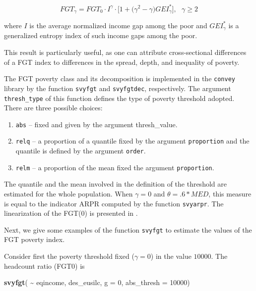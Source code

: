 \documentclass[
]{book}
\newenvironment{Shaded}{\begin{snugshade}}{\end{snugshade}}
\newcommand{\AttributeTok}[1]{\textcolor[rgb]{0.13,0.29,0.53}{#1}}
\newcommand{\DecValTok}[1]{\textcolor[rgb]{0.00,0.00,0.81}{#1}}
\newcommand{\FunctionTok}[1]{\textcolor[rgb]{0.13,0.29,0.53}{\textbf{#1}}}
\newcommand{\NormalTok}[1]{#1}
\newcommand{\SpecialCharTok}[1]{\textcolor[rgb]{0.81,0.36,0.00}{\textbf{#1}}}
\providecommand{\tightlist}{%
  \setlength{\itemsep}{0pt}\setlength{\parskip}{0pt}}
\begin{document}
\[
FGT_\gamma = FGT_0 \cdot I^\gamma \cdot \big[ 1 + \big( \gamma^2 -\gamma \big) GEI_\gamma^* \big] , \text{ } \gamma \geq 2
\]

where \(I\) is the average normalized income gap among the poor and \(GEI_\gamma^*\) is a generalized entropy index of such income gaps among the poor.

This result is particularly useful, as one can attribute cross-sectional differences of a FGT index to differences in the spread, depth, and inequality of poverty.

The FGT poverty class and its decomposition is implemented in the \texttt{convey} library by the function \texttt{svyfgt} and \texttt{svyfgtdec}, respectively.
The argument \texttt{thresh\_type} of this function defines the type of poverty threshold adopted.
There are three possible choices:

\begin{enumerate}
\def\labelenumi{\arabic{enumi}.}
\tightlist
\item
  \texttt{abs} -- fixed and given by the argument thresh\_value.
\item
  \texttt{relq} -- a proportion of a quantile fixed by the argument \texttt{proportion} and the quantile is defined by the argument \texttt{order}.
\item
  \texttt{relm} -- a proportion of the mean fixed the argument \texttt{proportion}.
\end{enumerate}

The quantile and the mean involved in the definition of the threshold are estimated for the whole population. When \(\gamma=0\) and \(\theta= .6*MED\), this measure is equal to the indicator ARPR computed by the function \texttt{svyarpr}. The linearization of the FGT(0) is presented in \textcite{berger2003}.

Next, we give some examples of the function \texttt{svyfgt} to estimate the values of the FGT poverty index.

Consider first the poverty threshold fixed (\(\gamma=0\)) in the value \(10000\). The headcount ratio (FGT0) is

\begin{Shaded}
\begin{Highlighting}[]
\FunctionTok{svyfgt}\NormalTok{( }\SpecialCharTok{\textasciitilde{}}\NormalTok{ eqincome, des\_eusilc, }\AttributeTok{g =} \DecValTok{0}\NormalTok{, }\AttributeTok{abs\_thresh =} \DecValTok{10000}\NormalTok{)}
\end{Highlighting}
\end{Shaded}
\end{document}
